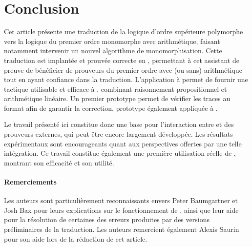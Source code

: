\section{Conclusion}

Cet article présente une traduction de la logique d'ordre supérieure
polymorphe vers la logique du premier ordre monomorphe avec
arithmétique, faisant notamment intervenir un nouvel algorithme de
monomorphisation. Cette traduction est implantée et prouvée correcte en
\holfour, permettant à cet assistant de preuve de bénéficier de
prouveurs du premier ordre avec (ou sans) arithmétique tout en ayant
confiance dans la traduction. L'application à \beagle permet de fournir
une tactique utilisable et efficace à \holfour, combinant raisonnement
propositionnel et arithmétique linéaire. Un premier prototype permet de
vérifier les traces au format \tff afin de garantir la correction,
prototype également appliquée à \beagle.

Le travail présenté ici constitue donc une base pour l'interaction entre
\holfour et des prouveurs externes, qui peut être encore largement
développée. Les résultats expérimentaux sont encourageants quant aux
perspectives offertes par une telle intégration. Ce travail constitue
également une première utilisation réelle de \beagle, montrant son
efficacité et son utilité.


\paragraph{Remerciements}

Les auteurs sont particulièrement reconnaissants envers Peter
Baumgartner et Josh Bax pour leurs explications sur le fonctionnement de
\beagle, ainsi que leur aide pour la résolution de certaines des erreurs
produites par des versions préliminaires de la traduction. Les auteurs
remercient également Alexis Saurin pour son aide lors de la rédaction de
cet article.
